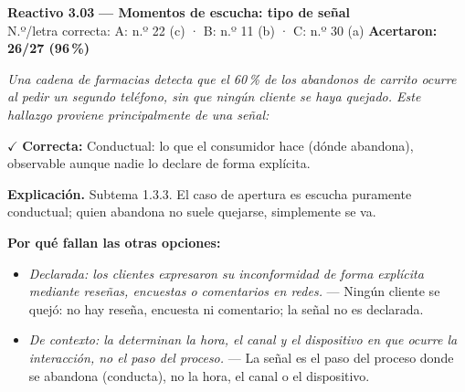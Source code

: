 \documentclass[10pt,letterpaper]{article}
\begin{document}
\begin{minipage}{\textwidth}
{\color{guinda}\textbf{Reactivo 3.03}} \textbf{— Momentos de escucha: tipo de señal}\\[-1pt]
{\scriptsize N.º/letra correcta: A: n.º 22 (c) · B: n.º 11 (b) · C: n.º 30 (a) \hfill \textbf{Acertaron: 26/27 (96\,\%)}}

\textit{Una cadena de farmacias detecta que el 60\,\% de los abandonos de carrito ocurre al pedir un segundo teléfono, sin que ningún cliente se haya quejado. Este hallazgo proviene principalmente de una señal:}

\textcolor{verde}{$\checkmark$} \textbf{Correcta:} Conductual: lo que el consumidor hace (dónde abandona), observable aunque nadie lo declare de forma explícita.

\textbf{Explicación.} Subtema 1.3.3. El caso de apertura es escucha puramente conductual; quien abandona no suele quejarse, simplemente se va.

\textbf{Por qué fallan las otras opciones:}
\begin{itemize}[itemsep=0pt,topsep=1pt,leftmargin=1.3em,parsep=0pt]
\item[\textcolor{rojo}{$\times$}] \textit{Declarada: los clientes expresaron su inconformidad de forma explícita mediante reseñas, encuestas o comentarios en redes.} --- Ningún cliente se quejó: no hay reseña, encuesta ni comentario; la señal no es declarada.
\item[\textcolor{rojo}{$\times$}] \textit{De contexto: la determinan la hora, el canal y el dispositivo en que ocurre la interacción, no el paso del proceso.} --- La señal es el paso del proceso donde se abandona (conducta), no la hora, el canal o el dispositivo.
\end{itemize}
\end{minipage}\par\vspace{5pt}{\color{gray!40}\hrule}\vspace{5pt}
\end{document}
